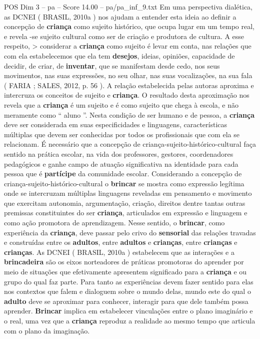 \begin{textsample}{POS Dim 3 – pa – Score 14.00 – pa/pa\_inf\_9.txt}
Em uma perspectiva dialética, as DCNEI ( BRASIL, 2010a ) nos ajudam a entender esta ideia ao definir a concepção de \textbf{criança} como sujeito histórico, que ocupa lugar em um tempo real, e revela -se sujeito cultural como ser de criação e produtora de cultura.
A esse respeito, > considerar a \textbf{criança} como sujeito é levar em conta, nas relações que com ela estabelecemos que ela tem \textbf{desejos}, ideias, opiniões, capacidade de decidir, de criar, de \textbf{inventar}, que se manifestam desde cedo, nos seus movimentos, nas suas expressões, no seu olhar, nas suas vocalizações, na sua fala ( FARIA ; SALES, 2012, p. 56 ).
A relação estabelecida pelas autoras aproxima e intercruza os conceitos de sujeito e \textbf{criança}.
O resultado desta aproximação nos revela que a \textbf{criança} é um sujeito e é como sujeito que chega à escola, e não meramente como “ aluno ”.
Nesta condição de ser humano e de pessoa, a \textbf{criança} deve ser considerada em suas especificidades e linguagens, características múltiplas que devem ser conhecidas por todos os profissionais que com ela se relacionam.
É necessário que a concepção de criança-sujeito-histórico-cultural faça sentido na prática escolar, na vida dos professores, gestores, coordenadores pedagógicos e ganhe campo de atuação significativa na identidade para cada pessoa que é \textbf{partícipe} da comunidade escolar.
Considerando a concepção de criança-sujeito-histórico-cultural o \textbf{brincar} se mostra como expressão legítima onde se intercruzam múltiplas linguagens reveladas em pensamento e movimento que exercitam autonomia, argumentação, criação, direitos dentre tantas outras premissas constituintes do ser \textbf{criança}, articulados em expressão e linguagem e como ação promotora de aprendizagem.
Nesse sentido, o \textbf{brincar}, como experiência da \textbf{criança}, deve passar pelo crivo do \textbf{sensorial} das relações travadas e construídas entre os \textbf{adultos}, entre \textbf{adultos} e \textbf{crianças}, entre \textbf{crianças} e \textbf{crianças}.
As DCNEI ( BRASIL, 2010a ) estabelecem que as interações e a \textbf{brincadeira} são os eixos norteadores de práticas promotoras do aprender por meio de situações que efetivamente apresentem significado para a \textbf{criança} e ou grupo do qual faz parte.
Para tanto as experiências devem fazer sentido para elas nos contextos que falem e dialoguem sobre o mundo delas, mundo este do qual o \textbf{adulto} deve se aproximar para conhecer, interagir para que dele também possa aprender. \textbf{Brincar} implica em estabelecer vinculações entre o plano imaginário e o real, uma vez que a \textbf{criança} reproduz a realidade ao mesmo tempo que articula com o plano da imaginação.

\end{textsample}
